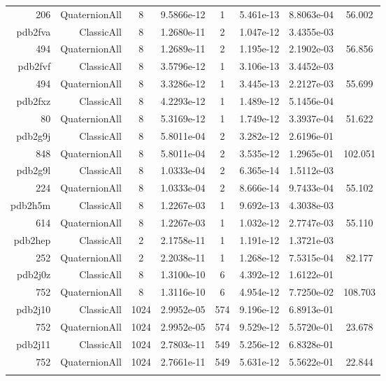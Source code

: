 \begin{xltabular}{\textwidth}{r|rcS[table-format=1.4e+2]cS[table-format=1.3e+2]S[table-format=1.4e+2]S[table-format=-1.3]}
206 & QuaternionAll & 8 & 9.5866e-12 & 1 & 5.461e-13 & 8.8063e-04 & 56.002\\  \addlinespace
pdb2fva & ClassicAll & 8 & 1.2680e-11 & 2 & 1.047e-12 & 3.4355e-03 & \\
494 & QuaternionAll & 8 & 1.2689e-11 & 2 & 1.195e-12 & 2.1902e-03 & 56.856\\  \addlinespace
pdb2fvf & ClassicAll & 8 & 3.5796e-12 & 1 & 3.106e-13 & 3.4452e-03 & \\
494 & QuaternionAll & 8 & 3.3286e-12 & 1 & 3.445e-13 & 2.2127e-03 & 55.699\\  \addlinespace
pdb2fxz & ClassicAll & 8 & 4.2293e-12 & 1 & 1.489e-12 & 5.1456e-04 & \\
80 & QuaternionAll & 8 & 5.3169e-12 & 1 & 1.749e-12 & 3.3937e-04 & 51.622\\  \addlinespace
pdb2g9j & ClassicAll & 8 & 5.8011e-04 & 2 & 3.282e-12 & 2.6196e-01 & \\
848 & QuaternionAll & 8 & 5.8011e-04 & 2 & 3.535e-12 & 1.2965e-01 & 102.051\\  \addlinespace
pdb2g9l & ClassicAll & 8 & 1.0333e-04 & 2 & 6.365e-14 & 1.5112e-03 & \\
224 & QuaternionAll & 8 & 1.0333e-04 & 2 & 8.666e-14 & 9.7433e-04 & 55.102\\  \addlinespace
pdb2h5m & ClassicAll & 8 & 1.2267e-03 & 1 & 9.692e-13 & 4.3038e-03 & \\
614 & QuaternionAll & 8 & 1.2267e-03 & 1 & 1.032e-12 & 2.7747e-03 & 55.110\\  \addlinespace
pdb2hep & ClassicAll & 2 & 2.1758e-11 & 1 & 1.191e-12 & 1.3721e-03 & \\
252 & QuaternionAll & 2 & 2.2038e-11 & 1 & 1.268e-12 & 7.5315e-04 & 82.177\\  \addlinespace
pdb2j0z & ClassicAll & 8 & 1.3100e-10 & 6 & 4.392e-12 & 1.6122e-01 & \\
752 & QuaternionAll & 8 & 1.3116e-10 & 6 & 4.954e-12 & 7.7250e-02 & 108.703\\  \addlinespace
pdb2j10 & ClassicAll & 1024 & 2.9952e-05 & 574 & 9.196e-12 & 6.8913e-01 & \\
752 & QuaternionAll & 1024 & 2.9952e-05 & 574 & 9.529e-12 & 5.5720e-01 & 23.678\\  \addlinespace
pdb2j11 & ClassicAll & 1024 & 2.7803e-11 & 549 & 5.256e-12 & 6.8328e-01 & \\
752 & QuaternionAll & 1024 & 2.7661e-11 & 549 & 5.631e-12 & 5.5622e-01 & 22.844\\  \addlinespace

\end{xltabular}
